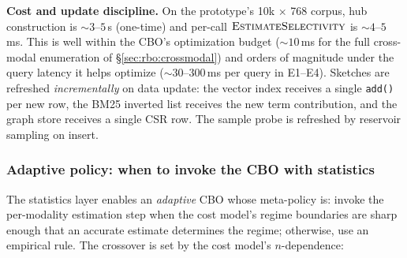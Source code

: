 \documentclass[sigconf,nonacm,review]{acmart}
\theoremstyle{plain}
\theoremstyle{definition}
\theoremstyle{remark}
\begin{document}
\noindent\textbf{Cost and update discipline.} On the prototype's
10k $\times$ 768 corpus, hub construction is $\sim 3$--$5$\,s
(one-time) and per-call $\Call{EstimateSelectivity}{}$ is
$\sim 4$--$5$\,ms. This is well within the CBO's optimization
budget ($\sim 10$\,ms for the full cross-modal enumeration of
\S\ref{sec:rbo:crossmodal}) and orders of magnitude under the
query latency it helps optimize ($\sim 30$--$300$\,ms per query
in E1--E4). Sketches are refreshed \emph{incrementally} on data
update: the vector index receives a single \texttt{add()} per
new row, the BM25 inverted list receives the new term
contribution, and the graph store receives a single CSR row.
The sample probe is refreshed by reservoir sampling on insert.

\subsubsection{Adaptive policy: when to invoke the CBO with statistics}

The statistics layer enables an \emph{adaptive} CBO whose
meta-policy is: invoke the per-modality estimation step when
the cost model's regime boundaries are sharp enough that an
accurate estimate determines the regime; otherwise, use an
empirical rule. The crossover is set by the cost model's
$n$-dependence:
\end{document}
